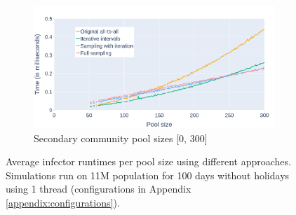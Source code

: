 \begin{figure}
    \begin{subfigure}{.8\linewidth}
        \centering
        \includegraphics[width=\textwidth]{4 - Sampling/fig/full_sampling/times_avg_fs_pType_secondary.png}
        \caption{Secondary community pool sizes [0, 300]}
        \label{fig:times_avg_fs_pType_secondary}
    \end{subfigure}
    \caption{Average infector runtimes per pool size using different approaches. Simulations run on 11M population for 100 days without holidays using 1 thread (configurations in Appendix \ref{appendix:configurations}).}
\end{figure}
